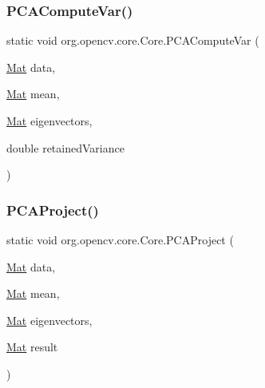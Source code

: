 \subsubsection{\texorpdfstring{P\+C\+A\+Compute\+Var()}{PCAComputeVar()}}
{\footnotesize\ttfamily static void org.\+opencv.\+core.\+Core.\+P\+C\+A\+Compute\+Var (\begin{DoxyParamCaption}\item[{\mbox{\hyperlink{classorg_1_1opencv_1_1core_1_1_mat}{Mat}}}]{data,  }\item[{\mbox{\hyperlink{classorg_1_1opencv_1_1core_1_1_mat}{Mat}}}]{mean,  }\item[{\mbox{\hyperlink{classorg_1_1opencv_1_1core_1_1_mat}{Mat}}}]{eigenvectors,  }\item[{double}]{retained\+Variance }\end{DoxyParamCaption})\hspace{0.3cm}{\ttfamily [static]}}

\mbox{\label{classorg_1_1opencv_1_1core_1_1_core_ac1b1800fd7a0b44ef5c5fbfe45d42eda}} 
\subsubsection{\texorpdfstring{P\+C\+A\+Project()}{PCAProject()}}
{\footnotesize\ttfamily static void org.\+opencv.\+core.\+Core.\+P\+C\+A\+Project (\begin{DoxyParamCaption}\item[{\mbox{\hyperlink{classorg_1_1opencv_1_1core_1_1_mat}{Mat}}}]{data,  }\item[{\mbox{\hyperlink{classorg_1_1opencv_1_1core_1_1_mat}{Mat}}}]{mean,  }\item[{\mbox{\hyperlink{classorg_1_1opencv_1_1core_1_1_mat}{Mat}}}]{eigenvectors,  }\item[{\mbox{\hyperlink{classorg_1_1opencv_1_1core_1_1_mat}{Mat}}}]{result }\end{DoxyParamCaption})\hspace{0.3cm}{\ttfamily [static]}}

\mbox{\label{classorg_1_1opencv_1_1core_1_1_core_a1ff0eace0f00e79af5228fdae120342a}} 
